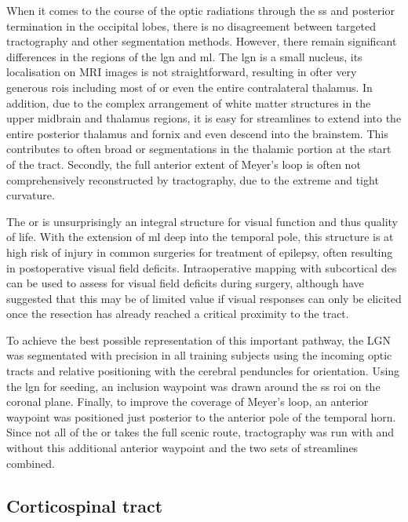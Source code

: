 When it comes to the course of the optic radiations through the \gls{ss} and posterior termination in the occipital lobes, there is no disagreement between targeted tractography and other segmentation methods.
However, there remain significant differences in the regions of the \gls{lgn} and \gls{ml}.
The \gls{lgn} is a small nucleus, its localisation on MRI images is not straightforward, resulting in ofter very generous \glspl{roi} including most of or even the entire contralateral thalamus.
In addition, due to the complex arrangement of white matter structures in the upper midbrain and thalamus regions, it is easy for streamlines to extend into the entire posterior thalamus and fornix and even descend into the brainstem.
This contributes to often broad \gls{or} segmentations in the thalamic portion at the start of the tract.
Secondly, the full anterior extent of Meyer's loop is often not comprehensively reconstructed by tractography, due to the extreme and tight curvature.\autocite{Lilja2015,Chamberland2018}

The \gls{or} is unsurprisingly an integral structure for visual function and thus quality of life.
With the extension of \gls{ml} deep into the temporal pole, this structure is at high risk of injury in common surgeries for treatment of epilepsy, often resulting in postoperative visual field deficits.\autocite{Lacerda2020}
Intraoperative mapping with subcortical \gls{des} can be used to assess for visual field deficits during surgery,\autocite{Duffau2004a,Mazerand2017} although \textcite{Shahar2018} have suggested that this may be of limited value if visual responses can only be elicited once the resection has already reached a critical proximity to the tract.

To achieve the best possible representation of this important pathway, the LGN was segmentated with precision in all training subjects using the incoming optic tracts and relative positioning with the cerebral penduncles for orientation.
Using the \gls{lgn} for seeding, an inclusion waypoint was drawn around the \gls{ss} \gls{roi} on the coronal plane.
Finally, to improve the coverage of Meyer's loop, an anterior waypoint was positioned just posterior to the anterior pole of the temporal horn.
Since not all of the \gls{or} takes the full scenic route, tractography was run with and without this additional anterior waypoint and the two sets of streamlines combined.

\subsection{Corticospinal tract}

